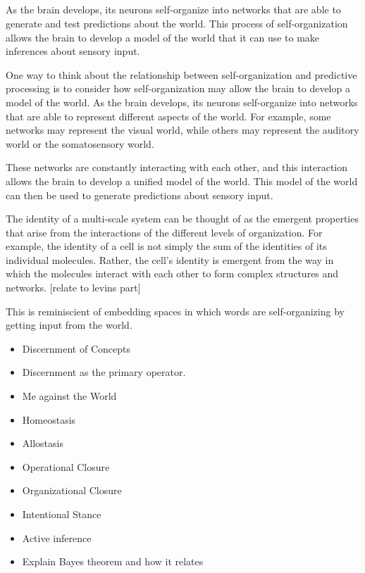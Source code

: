 \subsection{} \cite{friston_world_2021}
As the brain develops, its neurons self-organize into networks that are able to generate and test predictions about the world. This process of self-organization allows the brain to develop a model of the world that it can use to make inferences about sensory input.

One way to think about the relationship between self-organization and predictive processing is to consider how self-organization may allow the brain to develop a model of the world. As the brain develops, its neurons self-organize into networks that are able to represent different aspects of the world. For example, some networks may represent the visual world, while others may represent the auditory world or the somatosensory world.

These networks are constantly interacting with each other, and this interaction allows the brain to develop a unified model of the world. This model of the world can then be used to generate predictions about sensory input.

The identity of a multi-scale system can be thought of as the emergent properties that arise from the interactions of the different levels of organization. For example, the identity of a cell is not simply the sum of the identities of its individual molecules. Rather, the cell's identity is emergent from the way in which the molecules interact with each other to form complex structures and networks. [relate to levins part]

This is reminiscient of embedding spaces in which words are self-organizing by getting input from the world. 




\begin{itemize}
    \item Discernment of Concepts
    \item Discernment as the primary operator. 
    \item Me against the World
    \item Homeostasis
    \item Allostasis
    \item Operational Closure
    \item Organizational Closure
    \item Intentional Stance
    \item Active inference
    \item Explain Bayes theorem and how it relates 
\end{itemize}





